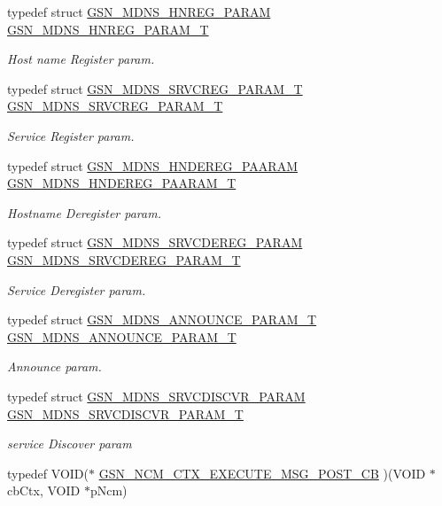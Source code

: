 \begin{DoxyCompactItemize}
typedef struct \hyperlink{a00143}{GSN\_\-MDNS\_\-HNREG\_\-PARAM} \hyperlink{a00668_ga511a566bafeaf7323d968328226d0c4a}{GSN\_\-MDNS\_\-HNREG\_\-PARAM\_\-T}
\begin{DoxyCompactList}\small\item\em Host name Register param. \end{DoxyCompactList}\item 
typedef struct \hyperlink{a00149}{GSN\_\-MDNS\_\-SRVCREG\_\-PARAM\_\-T} \hyperlink{a00668_ga20024e1aacee7fa459e6be0aaf450a16}{GSN\_\-MDNS\_\-SRVCREG\_\-PARAM\_\-T}
\begin{DoxyCompactList}\small\item\em Service Register param. \end{DoxyCompactList}\item 
typedef struct \hyperlink{a00142}{GSN\_\-MDNS\_\-HNDEREG\_\-PAARAM} \hyperlink{a00668_gae0bea67d1615b20dc8df1775f73c98ca}{GSN\_\-MDNS\_\-HNDEREG\_\-PAARAM\_\-T}
\begin{DoxyCompactList}\small\item\em Hostname Deregister param. \end{DoxyCompactList}\item 
typedef struct \hyperlink{a00147}{GSN\_\-MDNS\_\-SRVCDEREG\_\-PARAM} \hyperlink{a00668_ga1ec6492d157706d2baaf53959c6558b8}{GSN\_\-MDNS\_\-SRVCDEREG\_\-PARAM\_\-T}
\begin{DoxyCompactList}\small\item\em Service Deregister param. \end{DoxyCompactList}\item 
typedef struct \hyperlink{a00141}{GSN\_\-MDNS\_\-ANNOUNCE\_\-PARAM\_\-T} \hyperlink{a00668_ga41a672d3bce37ca4fe0d8b08524334a6}{GSN\_\-MDNS\_\-ANNOUNCE\_\-PARAM\_\-T}
\begin{DoxyCompactList}\small\item\em Announce param. \end{DoxyCompactList}\item 
typedef struct \hyperlink{a00148}{GSN\_\-MDNS\_\-SRVCDISCVR\_\-PARAM} \hyperlink{a00668_gae85953b9de0c8db5521e84d7a91149e1}{GSN\_\-MDNS\_\-SRVCDISCVR\_\-PARAM\_\-T}
\begin{DoxyCompactList}\small\item\em service Discover param \end{DoxyCompactList}\item 
typedef VOID($\ast$ \hyperlink{a00668_gaf3a0737ada4d7a112e4fff6779bc8162}{GSN\_\-NCM\_\-CTX\_\-EXECUTE\_\-MSG\_\-POST\_\-CB} )(VOID $\ast$cbCtx, VOID $\ast$pNcm)

\end{DoxyCompactItemize}
